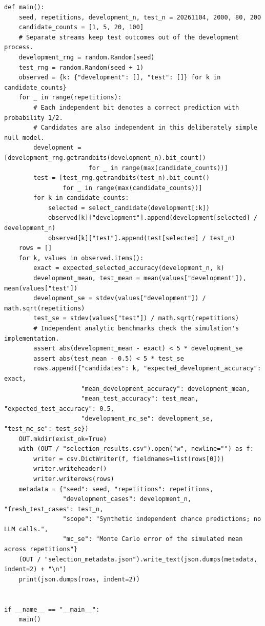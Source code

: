 \begin{Verbatim}[breaklines,breakanywhere,fontsize=\small]
def main():
    seed, repetitions, development_n, test_n = 20261104, 2000, 80, 200
    candidate_counts = [1, 5, 20, 100]
    # Separate streams keep test outcomes out of the development process.
    development_rng = random.Random(seed)
    test_rng = random.Random(seed + 1)
    observed = {k: {"development": [], "test": []} for k in candidate_counts}
    for _ in range(repetitions):
        # Each independent bit denotes a correct prediction with probability 1/2.
        # Candidates are also independent in this deliberately simple null model.
        development = [development_rng.getrandbits(development_n).bit_count()
                       for _ in range(max(candidate_counts))]
        test = [test_rng.getrandbits(test_n).bit_count()
                for _ in range(max(candidate_counts))]
        for k in candidate_counts:
            selected = select_candidate(development[:k])
            observed[k]["development"].append(development[selected] / development_n)
            observed[k]["test"].append(test[selected] / test_n)
    rows = []
    for k, values in observed.items():
        exact = expected_selected_accuracy(development_n, k)
        development_mean, test_mean = mean(values["development"]), mean(values["test"])
        development_se = stdev(values["development"]) / math.sqrt(repetitions)
        test_se = stdev(values["test"]) / math.sqrt(repetitions)
        # Independent analytic benchmarks check the simulation's implementation.
        assert abs(development_mean - exact) < 5 * development_se
        assert abs(test_mean - 0.5) < 5 * test_se
        rows.append({"candidates": k, "expected_development_accuracy": exact,
                     "mean_development_accuracy": development_mean,
                     "mean_test_accuracy": test_mean, "expected_test_accuracy": 0.5,
                     "development_mc_se": development_se, "test_mc_se": test_se})
    OUT.mkdir(exist_ok=True)
    with (OUT / "selection_results.csv").open("w", newline="") as f:
        writer = csv.DictWriter(f, fieldnames=list(rows[0]))
        writer.writeheader()
        writer.writerows(rows)
    metadata = {"seed": seed, "repetitions": repetitions,
                "development_cases": development_n, "fresh_test_cases": test_n,
                "scope": "Synthetic independent chance predictions; no LLM calls.",
                "mc_se": "Monte Carlo error of the simulated mean across repetitions"}
    (OUT / "selection_metadata.json").write_text(json.dumps(metadata, indent=2) + "\n")
    print(json.dumps(rows, indent=2))


if __name__ == "__main__":
    main()
\end{Verbatim}

